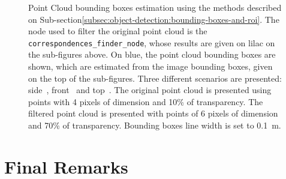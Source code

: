 \begin{figure}[ht!]
\begin{subfigure}[c]{0.8\textwidth}
		\label{fig:bboxes-3d-kitti-top}
	\end{subfigure}
	\caption{Point Cloud bounding boxes estimation using the methods described on Sub-section\ref{subsec:object-detection:bounding-boxes-and-roi}. The node used to filter the original point cloud is the \texttt{correspondences\_finder\_node}, whose results are given on lilac on the sub-figures above. On blue, the point cloud bounding boxes are shown, which are estimated from the image bounding boxes, given on the top of the sub-figures. Three different scenarios are presented: side~, front~ and top~. The original point cloud is presented using points with 4 pixels of dimension and 10\% of transparency. The filtered point cloud is presented with points of 6 pixels of dimension and 70\% of transparency. Bounding boxes line width is set to \SI{0.1}{\meter}.} 
	\label{fig:bboxes-3d-kitti}
\end{figure}



\section{Final Remarks}

